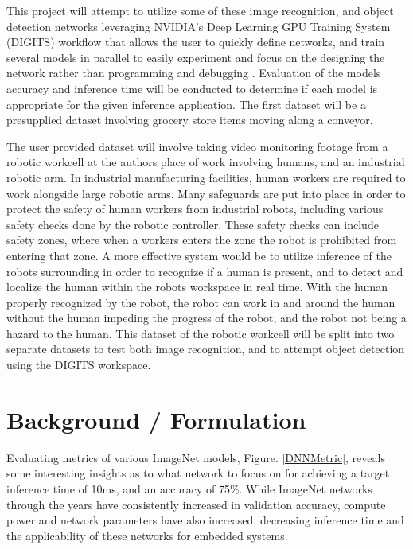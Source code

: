 \documentclass[10pt,journal,compsoc]{IEEEtran}
\begin{document}
This project will attempt to utilize some of these image recognition, and object detection networks leveraging NVIDIA's Deep Learning GPU Training System (DIGITS) workflow that allows the user to quickly define networks, and train several models in parallel to easily experiment and focus on the designing the network rather than programming and debugging \cite{NvidiaDN}. Evaluation of the models accuracy and inference time will be conducted to determine if each model is appropriate for the given inference application. The first dataset will be a presupplied dataset involving grocery store items moving along a conveyor.

The user provided dataset will involve taking video monitoring footage from a robotic workcell at the authors place of work involving humans, and an industrial robotic arm. In industrial manufacturing facilities, human workers are required to work alongside large robotic arms. Many safeguards are put into place in order to protect the safety of human workers from industrial robots, including various safety checks done by the robotic controller. These safety checks can include safety zones, where when a workers enters the zone the robot is prohibited from entering that zone. A more effective system would be to utilize inference of the robots surrounding in order to recognize if a human is present, and to detect and localize the human within the robots workspace in real time. With the human properly recognized by the robot, the robot can work in and around the human without the human impeding the progress of the robot, and the robot not being a hazard to the human. This dataset of the robotic workcell will be split into two separate datasets to test both image recognition, and to attempt object detection using the DIGITS workspace.

\section{Background / Formulation}
\label{sec:background}

Evaluating metrics of various ImageNet models, Figure. \ref{DNNMetric}, reveals some interesting insights as to what network to focus on for achieving a target inference time of 10ms, and an accuracy of 75\%. While ImageNet networks through the years have consistently increased in validation accuracy, compute power and network parameters have also increased, decreasing inference time and the applicability of these networks for embedded systems.
\end{document}
